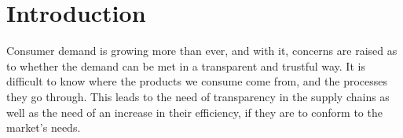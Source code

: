 \chapter{Introduction}
\label{chap:introduction}
\minitoc \mtcskip \noindent
{}
Consumer demand is growing more than ever, and with it, concerns are raised as to whether the demand can be met in a transparent and trustful way. It is difficult to know where the products we consume come from, and the processes they go through. This leads to the need of transparency in the supply chains as well as the need of an increase in their efficiency, if they are to conform to the market's needs.



